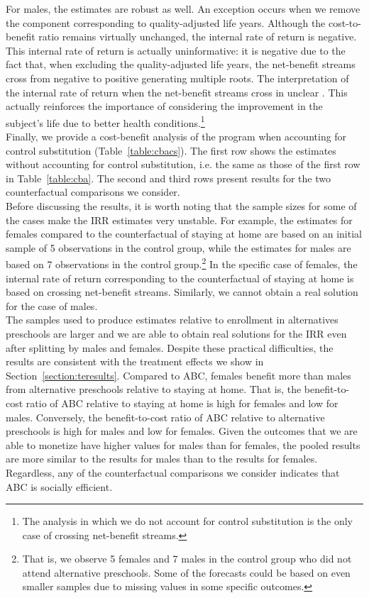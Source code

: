 \noindent For males, the estimates are robust as well. An exception occurs when we remove the component corresponding to quality-adjusted life years. Although the cost-to-benefit ratio remains virtually unchanged, the internal rate of return is negative. This internal rate of return is actually uninformative: it is negative due to the fact that, when excluding the quality-adjusted life years, the net-benefit streams cross from negative to positive generating multiple roots. The interpretation of the internal rate of return when the net-benefit streams cross in unclear \citep{Arrow-Levhari_1969_EJ}. This actually reinforces the importance of considering the improvement in the subject's life due to better health conditions.\footnote{The analysis in which we do not account for control substitution is the only case of crossing net-benefit streams.}\\

\noindent Finally, we provide a cost-benefit analysis of the program when accounting for control substitution (Table~\ref{table:cbacs}). The first row shows the estimates without accounting for control substitution, i.e. the same as those of the first row in Table~\ref{table:cba}. The second and third rows present results for the two counterfactual comparisons we consider.\\ 

\noindent Before discussing the results, it is worth noting that the sample sizes for some of the cases make the IRR estimates very unstable. For example, the estimates for females compared to the counterfactual of staying at home are based on an initial sample of 5 observations in the control group, while the estimates for males are based on 7  observations in the control group.\footnote{That is, we observe 5 females and 7 males in the control group who did not attend alternative preschools. Some of the forecasts could be based on even smaller samples due to missing values in some specific outcomes.} In the specific case of females, the internal rate of return corresponding to the counterfactual of staying at home is based on crossing net-benefit streams. Similarly, we cannot obtain a real solution for the case of males.\\ 

\noindent The samples used to produce estimates relative to enrollment in alternatives preschools are larger and we are able to obtain real solutions for the IRR even after splitting by males and females. Despite these practical difficulties, the results are consistent with the treatment effects we show in Section~\ref{section:teresults}. Compared to ABC, females benefit more than males from alternative preschools relative to staying at home. That is, the benefit-to-cost ratio of ABC relative to staying at home is high for females and low for males. Conversely, the benefit-to-cost ratio of ABC relative to alternative preschools is high for males and low for females. Given the outcomes that we are able to monetize have higher values for males than for females, the pooled results are more similar to the results for males than to the results for females. Regardless, any of the counterfactual comparisons we consider indicates that ABC is socially efficient. 

